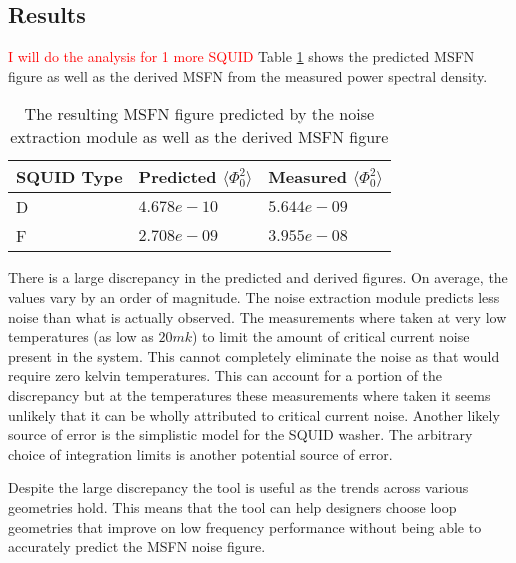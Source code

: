 \subsection{Results}
\textcolor{red}{I will do the analysis for 1 more SQUID}
Table \ref{tab:COMP} shows the predicted MSFN figure as well as the derived MSFN from the measured power spectral density. 
\begin{table}[H]
    \centering
    \begin{tabular}{lll}
    \hline
    SQUID Type & Predicted $\langle \Phi_0 ^2 \rangle$ & Measured $\langle \Phi_0 ^2 \rangle$ \\ \hline
    D          & $4.678e-10$                         & $5.644e-09$            \\
    F          & $2.708e-09$                         & $3.955e-08$            \\ \hline
    \end{tabular}
    \caption{The resulting MSFN figure predicted by the noise extraction module as well as the derived MSFN figure}
    \label{tab:COMP}
\end{table}

There is a large discrepancy in the predicted and derived figures. On average, the values vary by an order of magnitude. The noise extraction module predicts less noise than what is actually observed. The measurements where taken at very low temperatures (as low as $20 mk$) to limit the amount of critical current noise present in the system. This cannot completely eliminate the noise as that would require zero kelvin temperatures. This can account for a portion of the discrepancy but at the temperatures these measurements where taken it seems unlikely that it can be wholly attributed to critical current noise. Another likely source of error is the simplistic model for the SQUID washer. The arbitrary choice of integration limits is another potential source of error. \par 
Despite the large discrepancy the tool is useful as the trends across various geometries hold. This means that the tool can help designers choose loop geometries that improve on low frequency performance without being able to accurately predict the MSFN noise figure.